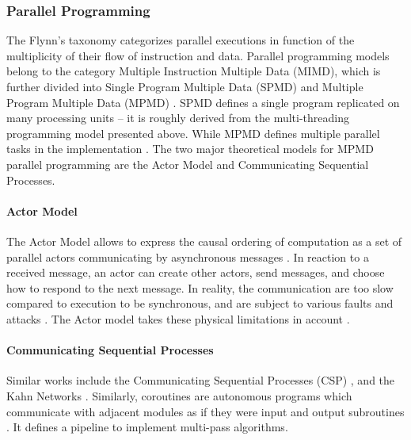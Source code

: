 \subsubsection{Parallel Programming} \label{chapter3:software-efficiency:concurrency:parallel-programming}

The Flynn's taxonomy \cite{Flynn1972} categorizes parallel executions in function of the multiplicity of their flow of instruction and data.
Parallel programming models belong to the category Multiple Instruction Multiple Data (MIMD), which is further divided into Single Program Multiple Data (SPMD) \cite{Auguin1983,Darema1988,Darema2001} and Multiple Program Multiple Data (MPMD) \cite{Chang1997,Chan2004}.
SPMD defines a single program replicated on many processing units \cite{Culler,Johnson1995,K.ManiChandy2005} -- it is roughly derived from the multi-threading programming model presented above.
While MPMD defines multiple parallel tasks in the implementation \cite{Grimshaw1991,Foster1995b,Foster1996}.
The two major theoretical models for MPMD parallel programming are the Actor Model and Communicating Sequential Processes.


\paragraph{Actor Model}

The Actor Model allows to express the causal ordering of computation as a set of parallel actors communicating by asynchronous messages \cite{Hewitt1973a, Hewitt1977, Clinger1981}.
In reaction to a received message, an actor can create other actors, send messages, and choose how to respond to the next message.
In reality, the communication are too slow compared to execution to be synchronous, and are subject to various faults and attacks \cite{Lamport1982}.
The Actor model takes these physical limitations in account \cite{Hewitt1977a}.
\paragraph{Communicating Sequential Processes}

Similar works include the Communicating Sequential Processes (CSP) \cite{Hoare1978, Brookes1984}, and the Kahn Networks \cite{Kahn1974, Kahn1976}.
Similarly, coroutines are autonomous programs which communicate with adjacent modules as if they were input and output subroutines \cite{Conway1963}.
It defines a pipeline to implement multi-pass algorithms.

